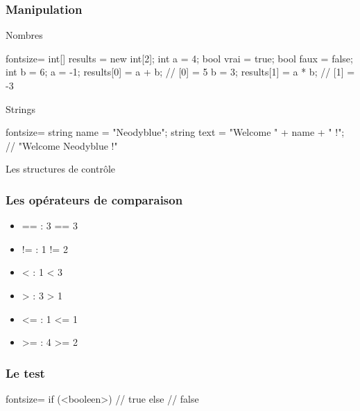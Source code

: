 \begin{frame}[fragile]
  \frametitle{Manipulation}

  \begin{center}{\large Nombres}\end{center}
  \begin{csharpcode*}{fontsize=\scriptsize}
    int[] results = new int[2];
    int a = 4;
    bool vrai = true;
    bool faux = false;
    int b = 6;
    a = -1;
    results[0] = a + b; // [0] = 5
    b = 3;
    results[1] = a * b; // [1] = -3
  \end{csharpcode*}

  \pause

  \begin{center}{\large Strings}\end{center}
  \begin{csharpcode*}{fontsize=\scriptsize}
    string name = "Neodyblue";
    string text = "Welcome " + name + " !"; // "Welcome Neodyblue !"
  \end{csharpcode*}
\end{frame}

\begin{frame}
  \begin{center}
    \vspace{1cm}
    Les structures de contrôle
  \end{center}
\end{frame}

\begin{frame}[fragile]
  \frametitle{Les opérateurs de comparaison}

  \begin{itemize}
    \item<+-> == : 3 == 3
    \item<+-> != : 1 != 2
    \item<+-> < : 1 < 3
    \item<+-> > : 3 > 1
    \item<+-> <= : 1 <= 1
    \item<+-> >= : 4 >= 2
  \end{itemize}
\end{frame}

\begin{frame}[fragile]
  \frametitle{Le test}

  \begin{csharpcode*}{fontsize=\scriptsize}
    if (<booleen>)
    {
      // true
    }
    else
    {
      // false
    }
  \end{csharpcode*}
\end{frame}

